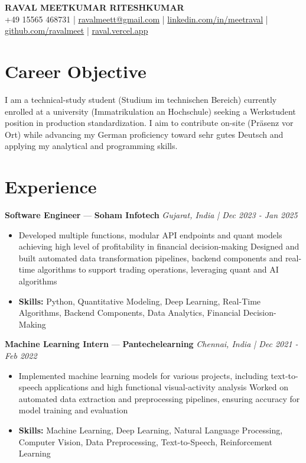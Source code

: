 \documentclass[a4paper,10pt]{article}
\begin{document}
\begin{center}
  {\Large\bfseries RAVAL MEETKUMAR RITESHKUMAR}\\[2pt]
  {\small +49 15565 468731 \;|\; \href{mailto:ravalmeett@gmail.com}{ravalmeett@gmail.com} \;|\; \href{https://www.linkedin.com/in/meetraval/}{linkedin.com/in/meetraval} \;|\; \href{https://github.com/ravalmeet}{github.com/ravalmeet} \;|\; \href{https://raval.vercel.app/}{raval.vercel.app}}
\end{center}
\vspace{-3pt}

\section*{Career Objective}
I am a technical-study student (Studium im technischen Bereich) currently enrolled at a university (Immatrikulation an Hochschule) seeking a Werkstudent position in production standardization. I aim to contribute on-site (Präsenz vor Ort) while advancing my German proficiency toward sehr gutes Deutsch and applying my analytical and programming skills.\par

\section*{Experience}
\textbf{Software Engineer} — \textbf{Soham Infotech} \hfill \textit{Gujarat, India \;|\; Dec 2023 - Jan 2025}\par
\vspace{1pt}
\begin{itemize}
  \item Developed multiple functions, modular API endpoints and quant models achieving high level of profitability in financial decision-making Designed and built automated data transformation pipelines, backend components and real-time algorithms to support trading operations, leveraging quant and AI algorithms
  \item \textbf{Skills:} Python, Quantitative Modeling, Deep Learning, Real-Time Algorithms, Backend Components, Data Analytics, Financial Decision-Making
\end{itemize}
\vspace{3pt}
\textbf{Machine Learning Intern} — \textbf{Pantechelearning} \hfill \textit{Chennai, India \;|\; Dec 2021 - Feb 2022}\par
\vspace{1pt}
\begin{itemize}
  \item Implemented machine learning models for various projects, including text-to-speech applications and high functional visual-activity analysis Worked on automated data extraction and preprocessing pipelines, ensuring accuracy for model training and evaluation
  \item \textbf{Skills:} Machine Learning, Deep Learning, Natural Language Processing, Computer Vision, Data Preprocessing, Text-to-Speech, Reinforcement Learning
\end{itemize}
\end{document}

